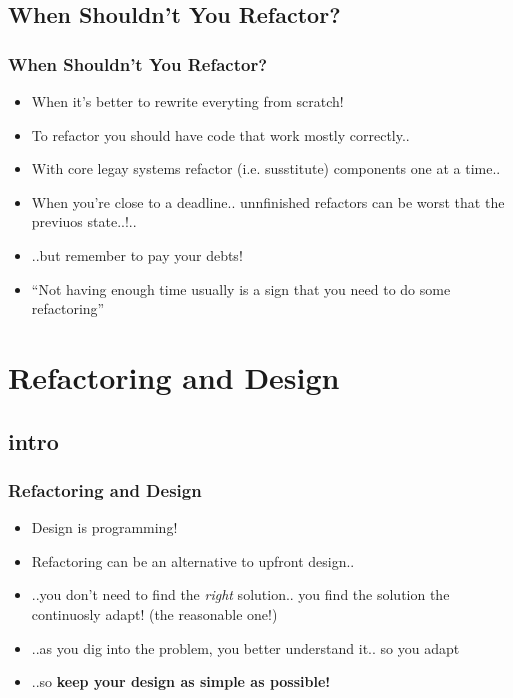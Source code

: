 \documentclass{beamer}
\begin{document}
\subsection{When Shouldn't You Refactor?}
\begin{frame}
  \frametitle{When Shouldn't You Refactor?} 
  \begin{itemize}
  		\item<+-> When it's better to rewrite everyting from scratch!
  		\item<+-> To refactor you should have code that work mostly correctly..
  		\item<+-> With core legay systems refactor (i.e. susstitute) components one at a time..
  		\item<+-> When you're close to a deadline.. unnfinished refactors can be worst that the previuos state..!..
  		\item<+-> ..but remember to pay your debts!
  		\item<+-> ``Not having enough time usually is a sign that you need to do some refactoring''
  \end{itemize}
\end{frame}

\section{Refactoring and Design}
\subsection{intro}
\begin{frame}
  \frametitle{Refactoring and Design} 
  \begin{itemize}
  		\item<+-> Design is programming!
  		\item<+-> Refactoring can be an alternative to upfront design.. 
  		\item<+-> ..you don't need to find the \textit{right} solution.. you find the solution the continuosly adapt! (the reasonable one!)
  		\item<+-> ..as you dig into the problem, you better understand it.. so you adapt
  		\item<+-> ..so \textbf{keep your design as simple as possible!}
  \end{itemize}
\end{frame}  
  
\end{document}
